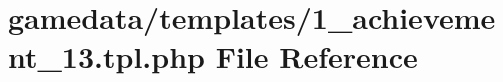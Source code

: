 \hypertarget{1__achievement__13_8tpl_8php}{\section{gamedata/templates/1\+\_\+achievement\+\_\+13.tpl.\+php File Reference}
\label{1__achievement__13_8tpl_8php}
}

